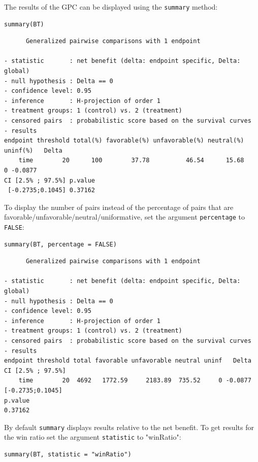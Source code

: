 \documentclass[12pt]{article}
\begin{document}
The results of the GPC can be displayed using the \texttt{summary} method:
\lstset{language=r,label= ,caption= ,captionpos=b,numbers=none}
\begin{lstlisting}
summary(BT)
\end{lstlisting}

\begin{verbatim}
      Generalized pairwise comparisons with 1 endpoint

- statistic       : net benefit (delta: endpoint specific, Delta: global) 
- null hypothesis : Delta == 0 
- confidence level: 0.95 
- inference       : H-projection of order 1
- treatment groups: 1 (control) vs. 2 (treatment) 
- censored pairs  : probabilistic score based on the survival curves
- results
endpoint threshold total(%) favorable(%) unfavorable(%) neutral(%) uninf(%)   Delta
    time        20      100        37.78          46.54      15.68        0 -0.0877
CI [2.5% ; 97.5%] p.value 
 [-0.2735;0.1045] 0.37162
\end{verbatim}

 To display the number of pairs instead of the percentage of pairs
that are favorable/unfavorable/neutral/uniformative, set the argument
\texttt{percentage} to \texttt{FALSE}:
\lstset{language=r,label= ,caption= ,captionpos=b,numbers=none}
\begin{lstlisting}
summary(BT, percentage = FALSE)
\end{lstlisting}

\begin{verbatim}
      Generalized pairwise comparisons with 1 endpoint

- statistic       : net benefit (delta: endpoint specific, Delta: global) 
- null hypothesis : Delta == 0 
- confidence level: 0.95 
- inference       : H-projection of order 1
- treatment groups: 1 (control) vs. 2 (treatment) 
- censored pairs  : probabilistic score based on the survival curves
- results
endpoint threshold total favorable unfavorable neutral uninf   Delta CI [2.5% ; 97.5%]
    time        20  4692   1772.59     2183.89  735.52     0 -0.0877  [-0.2735;0.1045]
p.value 
0.37162
\end{verbatim}

\bigskip

By default \texttt{summary} displays results relative to the net benefit. To
get results for the win ratio set the argument \texttt{statistic} to
"winRatio":
\lstset{language=r,label= ,caption= ,captionpos=b,numbers=none}
\begin{lstlisting}
summary(BT, statistic = "winRatio")
\end{lstlisting}
\end{document}
